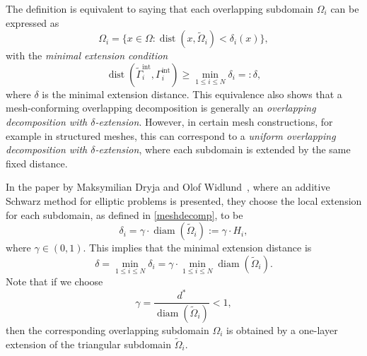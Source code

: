 \noindent The definition is equivalent to saying that each overlapping subdomain $\Omega_i$ can be expressed as
\begin{equation*}
    \Omega_{i} = \{x\in\Omega : \operatorname{dist}(x, \widetilde{\Omega}_{i}) < \delta_{i}(x)\},
\end{equation*}
with the \textit{minimal extension condition}
\begin{equation*}
    \operatorname{dist}(\widetilde{\Gamma}_i^{\text{int}}, \Gamma_i^{\text{int}}) \geq \min_{1\leq i \leq N}\delta_{i} = : \delta,
\end{equation*}
where $\delta$ is the minimal extension distance. This equivalence also shows that a mesh-conforming overlapping decomposition is generally an 
\emph{overlapping decomposition with $\delta$-extension}. However, in certain mesh constructions, for example in structured meshes, this can 
correspond to a \emph{uniform overlapping decomposition with $\delta$-extension}, where each subdomain is extended by the same fixed distance.

\vspace{10pt}
\noindent In the paper by Maksymilian Dryja and Olof Widlund~\cite{DryjaWidlund1987}, where an additive Schwarz method for elliptic problems is presented, they choose the local extension for each subdomain, as defined in \ref{meshdecomp}, to be
\begin{equation*}
    \delta_i = \gamma \cdot \operatorname{diam}(\widetilde{\Omega}_{i}) := \gamma \cdot H_{i},
\end{equation*}
where $\gamma \in (0,1)$. This implies that the minimal extension distance is 
\begin{equation*}
    \delta = \min_{1\leq i \leq N}\delta_{i} = \gamma \cdot \min_{1\leq i \leq N}\operatorname{diam}(\widetilde{\Omega}_{i}).
\end{equation*}
Note that if we choose
\begin{equation*}
    \gamma = \dfrac{d^{*}}{\operatorname{diam}(\widetilde{\Omega}_{i})} < 1,
\end{equation*}
then the corresponding overlapping subdomain $\Omega_i$ is obtained by a one-layer extension of the triangular subdomain $\widetilde{\Omega}_i$.